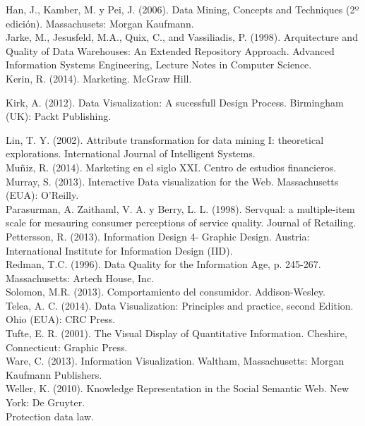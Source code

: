 Han, J., Kamber, M. y Pei, J. (2006). Data Mining, Concepts and Techniques (2º
edición). Massachusets: Morgan Kaufmann.\\

Jarke, M., Jesusfeld, M.A., Quix, C., and Vassiliadis, P. (1998). Arquitecture and Quality
of Data Warehouses: An Extended Repository Approach. Advanced Information Systems
Engineering, Lecture Notes in Computer Science.\\

Kerin, R. (2014). Marketing. McGraw Hill. 

Kirk, A. (2012). Data Visualization: A sucessfull Design Process. Birmingham (UK):
Packt Publishing.

Lin, T. Y. (2002). Attribute transformation for data mining I: theoretical explorations.
International Journal of Intelligent Systems.\\

Muñiz, R. (2014). Marketing en el siglo XXI. Centro de estudios financieros. \\

Murray, S. (2013). Interactive Data visualization for the Web. Massachusetts (EUA):
O’Reilly.\\

Parasurman, A. Zaithaml, V. A. y Berry, L. L. (1998). Servqual: a multiple-item scale for
mesauring consumer perceptions of service quality. Journal of Retailing.\\ 

Pettersson, R. (2013). Information Design 4- Graphic Design. Austria: International
Institute for Information Design (IID).\\

Redman, T.C. (1996). Data Quality for the Information Age, p. 245-267. Massachusetts:
Artech House, Inc.\\

Solomon, M.R. (2013). Comportamiento del consumidor. Addison-Wesley.\\

Telea, A. C. (2014). Data Visualization: Principles and practice, second Edition. Ohio
(EUA): CRC Press. \\

Tufte, E. R. (2001). The Visual Display of Quantitative Information. Cheshire,
Connecticut: Graphic Press.\\

 Ware, C. (2013). Information Visualization. Waltham, Massachusetts: Morgan
Kaufmann Publishers. \\

Weller, K. (2010). Knowledge Representation in the Social Semantic Web. New York:
De Gruyter. \\





Protection data law.

